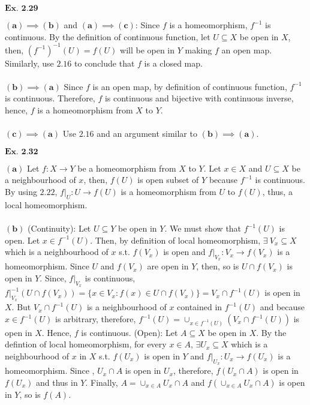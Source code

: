 \documentclass{article}
\begin{document}
\vspace{0.2in}

${\textbf{Ex. 2.29}}$

$\mathbf{(a)}\implies \mathbf{(b)}$ and $\mathbf{(a)}\implies \mathbf{(c)}$: Since $f$ is a homeomorphism, $f^{-1}$ is continuous. By the definition of continuous function, let $U \subseteq X$ be open in $X$, then, $(f^{-1})^{-1}(U) = f(U)$ will be open in $Y$ making $f$ an open map. Similarly, use $\mathbf{2.16}$ to conclude that $f$ is a closed map.\\~\\

$\mathbf{(b)}\implies \mathbf{(a)}$ Since $f$ is an open map, by definition of continuous function, $f^{-1}$ is continuous. Therefore, $f$ is continuous and bijective with continuous inverse, hence, $f$ is a homeomorphism from $X$ to $Y$.\\~\\

$\mathbf{(c)}\implies \mathbf{(a)}$ Use $\mathbf{2.16}$ and an argument similar to $\mathbf{(b)}\implies \mathbf{(a)}$.

\vspace{0.2in}

${\textbf{Ex. 2.32}}$

$\mathbf{(a)}$ Let $f:X\rightarrow Y$ be a homeomorphism from $X$ to $Y$. Let $x \in X$ and $U \subseteq X$ be a neighbourhood of $x$, then, $f(U)$ is open subset of $Y$ because $f^{-1}$ is continuous. By using $\mathbf{2.22}$, $f\big\vert_{U}:U\rightarrow f(U)$ is a homeomorphism from $U$ to $f(U)$, thus, a local homeomorphism.\\~\\

$\mathbf{(b)}$ (Continuity): Let $U \subseteq Y$ be open in $Y$. We must show that $f^{-1}(U)$ is open. Let $x \in f^{-1}(U)$. Then, by definition of local homeomorphism, $\exists\ V_x \subseteq X$ which is a neighbourhood of $x$ s.t. $f(V_x)$ is open and $f\big\vert_{V_x}:V_x\rightarrow f(V_x)$ is a homeomorphism. Since $U$ and $f(V_x)$ are open in $Y$, then, so is $U \cap f(V_x)$ is open in $Y$. Since, $f\big\vert_{V_x}$ is continuous, $f\big\vert_{V_x}^{-1}(U \cap f(V_x)) = \{x \in V_x: f(x) \in U \cap f(V_x)\} = V_x \cap f^{-1}(U)$ is open in $X$. But $V_x \cap f^{-1}(U)$ is a neighbourhood of $x$ contained in $f^{-1}(U)$ and because $x \in f^{-1}(U)$ is arbitrary, therefore, $f^{-1}(U) = \cup_{x \in f^{-1}(U)}(V_x\cap f^{-1}(U))$ is open in $X$. Hence, $f$ is continuous. (Open): Let $A\subseteq X$ be open in $X$. By the defintion of local homeomorphism, for every $x \in A$, $\exists U_x \subseteq X$ which is a neighbourhood of $x$ in $X$ s.t. $f(U_x)$ is open in $Y$ and $f\big\vert_{U_x}:U_x \rightarrow f(U_x)$ is a homeomorphism. Since , $U_x \cap A$ is open in $U_x$, therefore, $f(U_x \cap A)$ is open in $f(U_x)$ and thus in $Y$. Finally, $A = \cup_{x \in A} U_x \cap A$ and $f(\cup_{x \in A} U_x \cap A)$ is open in $Y$, so is $f(A)$.\\~\\
\end{document}
